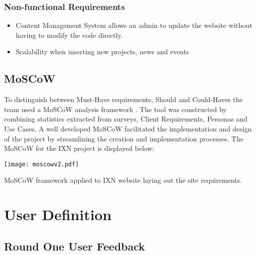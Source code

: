 \documentclass[fontsize=11pt]{extarticle}
\numberwithin{figure}{section} %
\numberwithin{table}{section}%
\providecommand{\tightlist}{%
  \setlength{\itemsep}{0pt}\setlength{\parskip}{0pt}}
\begin{document}
\hypertarget{non-functional-requirements}{%
\subsubsection{Non-functional
Requirements}\label{non-functional-requirements}}

\begin{itemize}
\tightlist
\item
  Content Management System allows an admin to update the website
  without having to modify the code directly.
\item
  Scalability when inserting new projects, news and events
\end{itemize}

\hypertarget{moscow}{%
\subsection{MoSCoW}\label{moscow}}

To distinguish between Must-Have requirements, Should and Could-Haves
the team used a MoSCoW analysis framework \cite{g4}. The tool was
constructed by combining statistics extracted from surveys, Client
Requirements, Personas and Use Cases. A well developed MoSCoW
facilitated the implementation and design of the project by streamlining
the creation and implementation processes. The MoSCoW for the IXN
project is displayed below:

\newpage

\begin{landscape}
\begin{table}[H]
      \centering
      \texttt{[image: moscowv2.pdf]}
      \caption{MoSCoW framework applied to IXN website laying out the site requirements.}
 \end{table}
 \end{landscape}

\newpage

\hypertarget{user-definition}{%
\section{User Definition}\label{user-definition}}

\hypertarget{round-one-user-feedback}{%
\subsection{Round One User Feedback}\label{round-one-user-feedback}}
\end{document}
